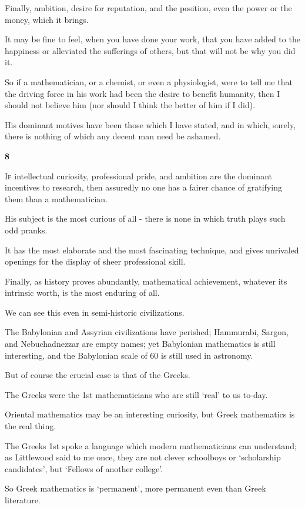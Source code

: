\documentclass{article}
\numberwithin{equation}{section}
\begin{document}
Finally, ambition, desire for reputation, and the position, even the power or the money, which it brings.

It may be fine to feel, when you have done your work, that you have added to the happiness or alleviated the sufferings of others, but that will not be why you did it.

So if a mathematician, or a chemist, or even a physiologist, were to tell me that the driving force in his work had been the desire to benefit humanity, then I should not believe him (nor should I think the better of him if I did).

His dominant motives have been those which I have stated, and in which, surely, there is nothing of which any decent man need be ashamed.

\begin{center}
    \large\textbf{8}
\end{center}
\textsc{If} intellectual curiosity, professional pride, and ambition are the dominant incentives to research, then assuredly no one has a fairer chance of gratifying them than a mathematician.

His subject is the most curious of all - there is none in which truth plays such odd pranks.

It has the most elaborate and the most fascinating technique, and gives unrivaled openings for the display of sheer professional skill.

Finally, as history proves abundantly, mathematical achievement, whatever its intrinsic worth, is the most enduring of all.

%
We can see this even in semi-historic civilizations.

The Babylonian and Assyrian civilizations have perished; Hammurabi, Sargon, and Nebuchadnezzar are empty names; yet Babylonian mathematics is still interesting, and the Babylonian scale of 60 is still used in astronomy.

But of course the crucial case is that of the Greeks.

%
The Greeks were the 1st mathematicians who are still `real' to us to-day.

Oriental mathematics may be an interesting curiosity, but Greek mathematics is the real thing.

The Greeks 1st spoke a language which modern mathematicians can understand; as Littlewood said to me once, they are not clever schoolboys or `scholarship candidates', but `Fellows of another college'.

So Greek mathematics is `permanent', more permanent even than Greek literature.
\end{document}
